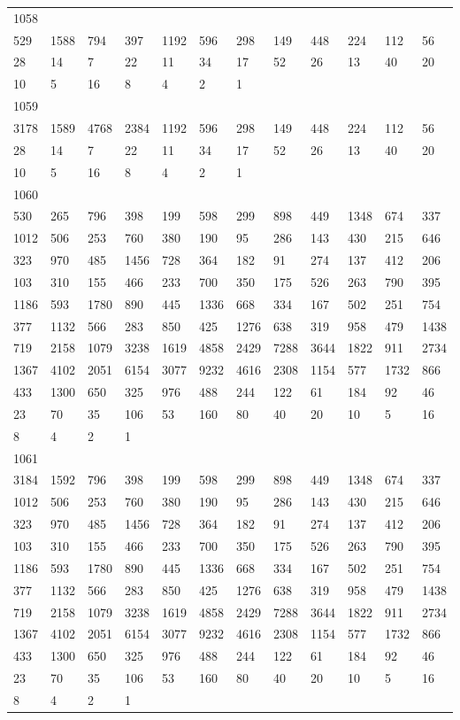 \begin{longtable}{llllllllllll}
1058&&&&&&&&&&&\\
529& 1588& 794& 397& 1192& 596& 298& 149& 448& 224& 112& 56\\
28& 14& 7& 22& 11& 34& 17& 52& 26& 13& 40& 20\\
10& 5& 16& 8& 4& 2& 1& \\

1059&&&&&&&&&&&\\
3178& 1589& 4768& 2384& 1192& 596& 298& 149& 448& 224& 112& 56\\
28& 14& 7& 22& 11& 34& 17& 52& 26& 13& 40& 20\\
10& 5& 16& 8& 4& 2& 1& \\

1060&&&&&&&&&&&\\
530& 265& 796& 398& 199& 598& 299& 898& 449& 1348& 674& 337\\
1012& 506& 253& 760& 380& 190& 95& 286& 143& 430& 215& 646\\
323& 970& 485& 1456& 728& 364& 182& 91& 274& 137& 412& 206\\
103& 310& 155& 466& 233& 700& 350& 175& 526& 263& 790& 395\\
1186& 593& 1780& 890& 445& 1336& 668& 334& 167& 502& 251& 754\\
377& 1132& 566& 283& 850& 425& 1276& 638& 319& 958& 479& 1438\\
719& 2158& 1079& 3238& 1619& 4858& 2429& 7288& 3644& 1822& 911& 2734\\
1367& 4102& 2051& 6154& 3077& 9232& 4616& 2308& 1154& 577& 1732& 866\\
433& 1300& 650& 325& 976& 488& 244& 122& 61& 184& 92& 46\\
23& 70& 35& 106& 53& 160& 80& 40& 20& 10& 5& 16\\
8& 4& 2& 1& \\

1061&&&&&&&&&&&\\
3184& 1592& 796& 398& 199& 598& 299& 898& 449& 1348& 674& 337\\
1012& 506& 253& 760& 380& 190& 95& 286& 143& 430& 215& 646\\
323& 970& 485& 1456& 728& 364& 182& 91& 274& 137& 412& 206\\
103& 310& 155& 466& 233& 700& 350& 175& 526& 263& 790& 395\\
1186& 593& 1780& 890& 445& 1336& 668& 334& 167& 502& 251& 754\\
377& 1132& 566& 283& 850& 425& 1276& 638& 319& 958& 479& 1438\\
719& 2158& 1079& 3238& 1619& 4858& 2429& 7288& 3644& 1822& 911& 2734\\
1367& 4102& 2051& 6154& 3077& 9232& 4616& 2308& 1154& 577& 1732& 866\\
433& 1300& 650& 325& 976& 488& 244& 122& 61& 184& 92& 46\\
23& 70& 35& 106& 53& 160& 80& 40& 20& 10& 5& 16\\
8& 4& 2& 1& \\


\end{longtable}
